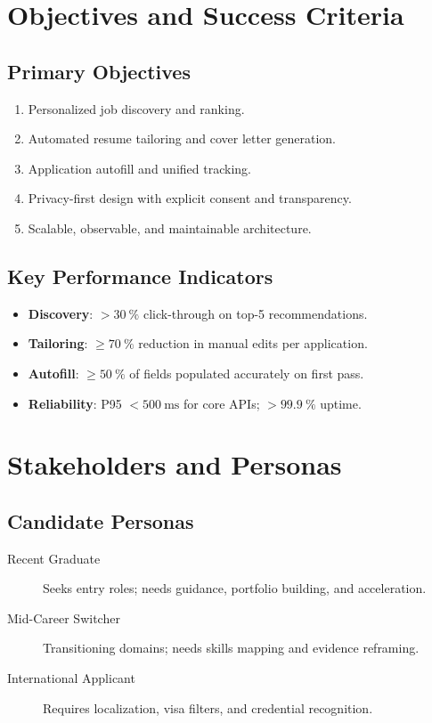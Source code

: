 \documentclass[12pt,a4paper]{article}
\begin{document}
\section{Objectives and Success Criteria}
\subsection{Primary Objectives}
\begin{enumerate}[leftmargin=2em]
  \item Personalized job discovery and ranking.
  \item Automated resume tailoring and cover letter generation.
  \item Application autofill and unified tracking.
  \item Privacy-first design with explicit consent and transparency.
  \item Scalable, observable, and maintainable architecture.
\end{enumerate}
\subsection{Key Performance Indicators}
\begin{itemize}[leftmargin=2em]
  \item \textbf{Discovery}: $>\SI{30}{\percent}$ click-through on top-5 recommendations.
  \item \textbf{Tailoring}: $\geq \SI{70}{\percent}$ reduction in manual edits per application.
  \item \textbf{Autofill}: $\geq \SI{50}{\percent}$ of fields populated accurately on first pass.
  \item \textbf{Reliability}: P95 $< \SI{500}{\milli\second}$ for core APIs; $>\SI{99.9}{\percent}$ uptime.
\end{itemize}

\section{Stakeholders and Personas}
\subsection{Candidate Personas}
\begin{description}
  \item[Recent Graduate] Seeks entry roles; needs guidance, portfolio building, and acceleration.
  \item[Mid-Career Switcher] Transitioning domains; needs skills mapping and evidence reframing.
  \item[International Applicant] Requires localization, visa filters, and credential recognition.
\end{description}
\end{document}
